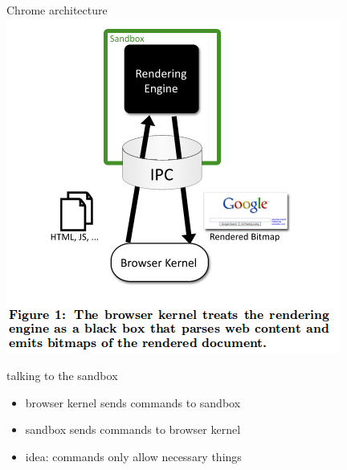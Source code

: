 \usetikzlibrary{positioning,shapes.callouts}

\begin{frame}{Chrome architecture}
    \includegraphics[height=0.8\textheight]{../sandbox/chrome-arch}
\end{frame}

\begin{frame}{talking to the sandbox}
    \begin{itemize}
    \item browser kernel sends commands to sandbox
    \item sandbox sends commands to browser kernel
    \item idea: commands only allow necessary things
    \end{itemize}
\end{frame}

